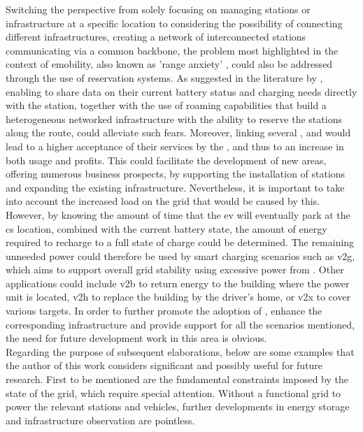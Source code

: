 \noindent Switching the perspective from solely focusing on managing stations or infrastructure at a specific location to considering the possibility of connecting different infrastructures, creating a network of interconnected stations communicating via a common backbone, the problem most highlighted in the context of \acrshort{emobility}, also known as 'range anxiety' \cite{rauh_understanding_2015}, could also be addressed through the use of reservation systems.
As suggested in the literature by \cite{zarkeshev_charging_2018}, enabling  to share data on their current battery status and charging needs directly with the station, together with the use of roaming capabilities that build a heterogeneous networked infrastructure with the ability to reserve the stations along the route, could alleviate such fears.
Moreover, linking several ,  and  would lead to a higher acceptance of their services by the , and thus to an increase in both usage and profits.
This could facilitate the development of new areas, offering numerous business prospects, by supporting the installation of stations and expanding the existing infrastructure.
Nevertheless, it is important to take into account the increased load on the grid that would be caused by this. However, by knowing the amount of time that the \acrshort{ev} will eventually park at the \acrshort{cs} location, combined with the current battery state, the amount of energy required to recharge to a full state of charge could be determined.
The remaining unneeded power could therefore be used by smart charging scenarios such as \acrshort{v2g}, which aims to support overall grid stability using excessive power from .
Other applications could include \acrshort{v2b} to return energy to the building where the power unit is located, \acrshort{v2h} to replace the building by the driver's home, or \acrshort{v2x} to cover various targets.
In order to further promote the adoption of , enhance the corresponding infrastructure and provide support for all the scenarios mentioned, the need for future development work in this area is obvious. \\
\noindent Regarding the purpose of subsequent elaborations, below are some examples that the author of this work considers significant and possibly useful for future research. 
First to be mentioned are the fundamental constraints imposed by the state of the grid, which require special attention. Without a functional grid to power the relevant stations and vehicles, further developments in energy storage and infrastructure observation are pointless.

